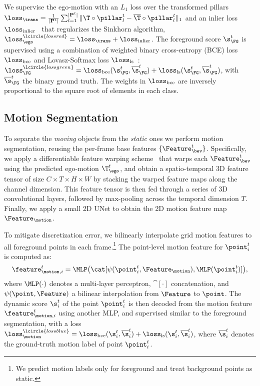 We supervise the ego-motion with an $L_1$ loss over the transformed pillars $\loss_\trans =\frac{1}{|\mathbf{P}^t|}  \sum_{l=1}^{|\mathbf{P}^t|} \| \T \circ \pillar_l^t - \overline{\T} \circ \pillar_l^t \|_{1}$ and an inlier loss $\loss_{\text{inlier}}$~\cite{yew2020rpm} that regularizes the Sinkhorn algorithm, $\loss_\ego^\lcircle{lossred}=\loss_\trans + \loss_{\text{inlier}}$.
The foreground score $\s_\FG^t$ is supervised using a combination of weighted binary cross-entropy (BCE) loss $\loss_{\text{bce}}$ and Lovasz-Softmax loss $\loss_{\text{ls}}$~\cite{berman2018lovasz}: $\loss_\FG^\lcircle{lossgreen} = \loss_{\text{bce}}(\s_\FG^t, \overline{\s}_\FG^t) + \loss_{\text{ls}}(\s_\FG^t, \overline{\s}_\FG^t)$, with $\overline{\s}^t_\FG$ the binary ground truth.
The weights in $\loss_{\text{bce}}$ are inversely proportional to the square root of elements in each class. 


\subsection{Motion Segmentation}
\label{sec:motion_seg}
To separate the \emph{moving} objects from the \emph{static} ones we perform motion segmentation, reusing the per-frame base features $\{\Feature_\bev^t\}$.
Specifically, we apply a differentiable feature warping scheme~\cite{sun2018pwc} that warps each $\Feature_\bev^t$ using the predicted ego-motion $\T^t_\ego$, and obtain a spatio-temporal 3D feature tensor of size {\small${C\times T\times H\times W}$} by stacking the warped feature maps along the channel dimension.
This feature tensor is then fed through a series of 3D convolutional layers, followed by max-pooling across the temporal dimension $T$. 
Finally, we apply a small 2D UNet to obtain the 2D motion feature map $\Feature_\motion$.

To mitigate discretization error, we bilinearly interpolate grid motion features to all foreground points in each frame.\footnote{We predict motion labels only for foreground and treat background points as static.}
The point-level motion feature for $\point_i^t$ is computed as:
\begin{equation}
    \label{eq:point-motion}
    \feature_{\motion,i}^t =\MLP\big(\cat[\psi(\point_i^t,\Feature_\motion), \MLP(\point_i^t)]\big),
\end{equation}
where $\MLP(\cdot)$ denotes a multi-layer perceptron, $\cat[\cdot]$ concatenation, and $\psi(\point, \Feature)$ a bilinear interpolation from $\Feature$ to $\point$.
The dynamic score $\s_i^t$ of the point $\point_i^t$ is then decoded from the motion feature $\feature_{\motion,i}^t$ using another MLP, and supervised similar to the foreground segmentation, with a loss $\loss_\motion^\lcircle{lossblue} = \loss_{\text{bce}}(\s_i^t, \overline{\s}_i^t) + \loss_{\text{ls}}(\s_i^t, \overline{\s}_i^t)$, where $\overline{\s}_i^t$ denotes the ground-truth motion label of point $\point_i^t$.

